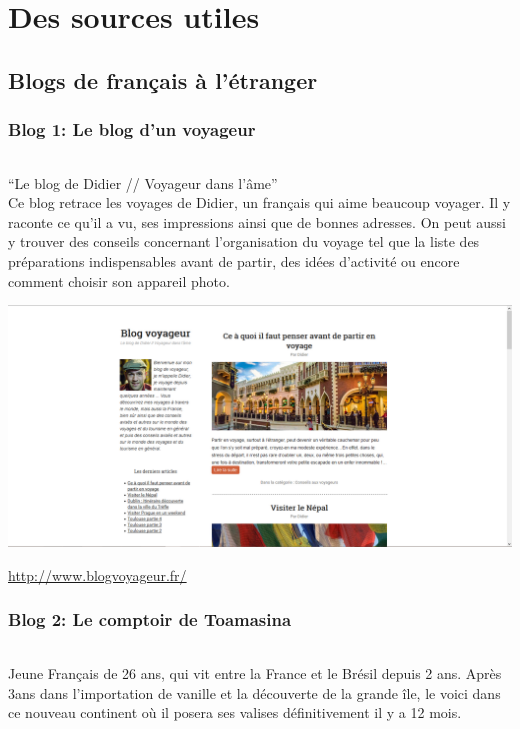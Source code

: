 \part{Des sources utiles}

\chapter{Blogs de français à l'étranger}

\section{Blog 1: Le blog d'un voyageur}

\paragraph{} ``Le blog de Didier // Voyageur dans l'âme'' \\
Ce blog retrace les voyages de Didier, un français qui aime beaucoup voyager.
Il y raconte ce qu'il a vu, ses impressions ainsi que de bonnes adresses. On
peut aussi y trouver des conseils concernant l'organisation du voyage tel que
la liste des préparations indispensables avant de partir, des idées d'activité
ou encore comment choisir son appareil photo.

\begin{center}
	\includegraphics[scale=0.25]{voyageur.png}
\end{center}
\url{http://www.blogvoyageur.fr/}

\section{Blog 2: Le comptoir de Toamasina}

\paragraph{} Jeune Français de 26 ans, qui vit entre la France et le Brésil
depuis 2 ans. Après 3ans dans l'importation de vanille et la découverte de la
grande île, le voici dans ce nouveau continent où il posera ses valises
définitivement il y a 12 mois.


